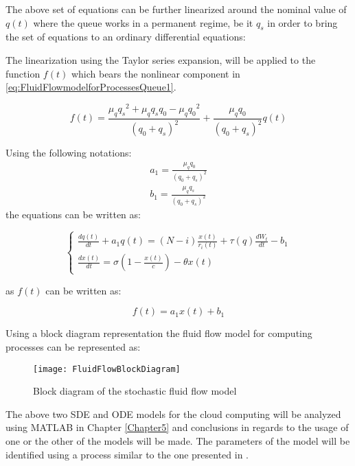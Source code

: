 The above set of equations can be further linearized around the nominal value of $q(t)$ where the queue works in a permanent regime, be it $q_{s}$ in order to bring the set of equations to an ordinary differential equations:

The linearization using the Taylor series expansion,  will be applied to the  function $f(t)$ which bears the nonlinear component in 
\ref{eq:FluidFlowmodelforProcessesQueue1}.

\begin{equation}
f(t) = \frac{\mu_{q}{q_{s}}^2 + \mu_{q}q_{s}q_{0} - \mu_{q}{q_{0}}^2}{(q_{0}+q_{s})^{2}} + \frac{\mu_{q}q_{0}}{(q_{0}+q_{s})^{2}}q(t) 
\label{eq:FluidFlowmodelforServers6}
\end{equation}

Using the following notations:
\begin{equation}
\begin{array}{l}
a_{1} = \frac{\mu_{q} q_{0}}{(q_{0}+q_{s})^{2}} \\
b_{1} = \frac{\mu_{q}q_{s}}{(q_{0}+q_{s})^{2}}
\end{array}
\end{equation}
the equations can be written as:

\begin{equation}
\begin{cases}
\frac{dq(t)}{dt} + a_{1}q(t)= (N-i)\frac{x(t)}{r_{i}(t)} +\tau(q) \frac{dW_{t}}{dt} - b_{1} \\
\frac{dx(t)}{dt} = \sigma (1-\frac{x(t)}{c})-\theta x(t)
\end{cases}
\label{eq:FluidFlowmodelforServers7}
\end{equation}

as $f(t)$ can be written as:

\begin{equation}
f(t) = a_{1}x(t) + b_{1}
\label{eq:FluidFlowmodelforServers8}
\end{equation}

Using a block diagram representation the fluid flow model for computing processes can be represented as:

\begin{figure}[htb!]
\texttt{[image: FluidFlowBlockDiagram]}
\caption{Block diagram of the stochastic fluid flow model}
\label{fig:FluidFlowBlockDiagram}
\end{figure}
  
The above two SDE and ODE models for the cloud computing will be analyzed using MATLAB in Chapter \ref{Chapter5} and conclusions in regards to the usage of one or the other of the models will be made. The parameters of the model will be identified using a process similar to the one presented in \cite{bsolomon:identification}.
